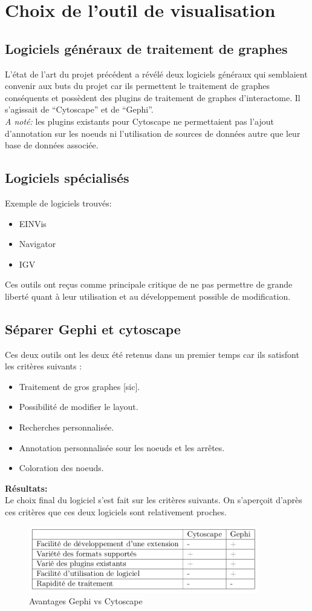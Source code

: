 \documentclass{article}
\begin{document}
\section{Choix de l'outil de visualisation}
\cite{Sisto:2015}
\subsection{Logiciels généraux de traitement de graphes}
L'état de l'art du projet précédent a révélé deux logiciels généraux qui semblaient convenir aux buts du projet car ils permettent le traitement de graphes conséquents et possèdent des plugins de traitement de graphes d'interactome. Il s'agissait de ``Cytoscape'' et de ``Gephi''. \\
\textit{A noté:} les plugins existants pour Cytoscape ne permettaient pas l'ajout d'annotation
sur les noeuds ni l'utilisation de sources de données autre que leur base de données
associée.
\subsection{Logiciels spécialisés}
Exemple de logiciels trouvés:
\begin{itemize}
  \item EINVis
  \item Navigator
  \item IGV
\end{itemize}
Ces outils ont reçus comme principale critique de ne pas permettre de grande liberté
quant à leur utilisation et au développement possible de modification.
\subsection{Séparer Gephi et cytoscape}
Ces deux outils ont les deux été retenus dans un premier temps car ils satisfont les critères suivants :
\begin{itemize}
  \item Traitement de gros graphes [sic].
  \item Possibilité de modifier le layout.
  \item Recherches personnalisée.
  \item Annotation personnalisée sour les noeuds et les arrêtes.
  \item Coloration des noeuds.
\end{itemize}
\textbf{Résultats:}\\
Le choix final du logiciel s'est fait sur les critères suivants. On s'aperçoit d'après
ces critères que ces deux logiciels sont relativement proches.
\begin{figure}[!h]
  \center
  \includegraphics[width=10cm]{gephi_vs.png}
  \caption{Avantages Gephi vs Cytoscape}
\end{figure}
\end{document}
